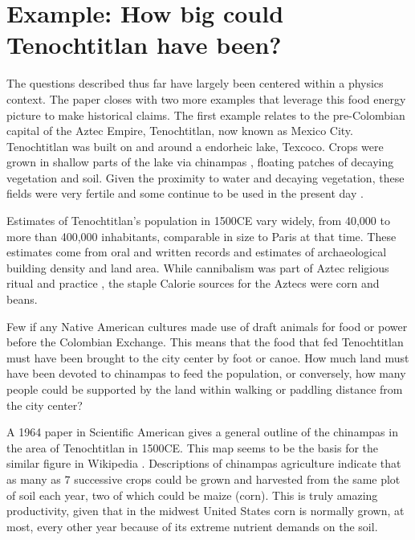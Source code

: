 \documentclass[prb,preprint]{revtex4-2}
\begin{document}
\clearpage

\section{Example: How big could Tenochtitlan have been?}
The questions described thus far have largely been centered within a physics context.  The paper closes with two more examples that leverage this food energy picture to make historical claims.  The first example relates to the pre-Colombian capital of the Aztec Empire, Tenochtitlan, now known as Mexico City.  Tenochtitlan was built on and around a endorheic lake, Texcoco.  Crops were grown in shallow parts of the lake via chinampas \cite{national_geo}, floating patches of decaying vegetation and soil.  Given the proximity to water and decaying vegetation, these fields were very fertile \cite{HortTech_2019,Chinampas_1964} and some continue to be used in the present day \cite{google_earth}.  


Estimates of Tenochtitlan's population in 1500CE vary widely, from 40,000 \cite{40k} to more than 400,000 \cite{400k} inhabitants, comparable in size to Paris at that time. These estimates come from oral and written records and estimates of archaeological building density and land area.   While cannibalism was part of Aztec religious ritual and practice \cite{Aztec_Cannibalism}, the staple Calorie sources for the Aztecs were corn and beans.

Few if any Native American cultures made use of draft animals for food or power before the Colombian Exchange.  This means that the food that fed Tenochtitlan must have been brought to the city center by foot or canoe.  How much land must have been devoted to chinampas to feed the population, or conversely, how many people could be supported by the land within walking or paddling distance from the city center?

A 1964 paper in Scientific American \cite{Chinampas_1964} gives a general outline of the chinampas in the area of Tenochtitlan in 1500CE.  This map seems to be the basis for the similar figure in Wikipedia \cite{chinampas_wikipedia}.  Descriptions of chinampas agriculture indicate that as many as $7$ successive crops could be grown and harvested from the same plot of soil each year, two of which could be maize (corn).  This is truly amazing productivity, given that in the midwest United States corn is normally grown, at most, every other year because of its extreme nutrient demands on the soil.
\end{document}
